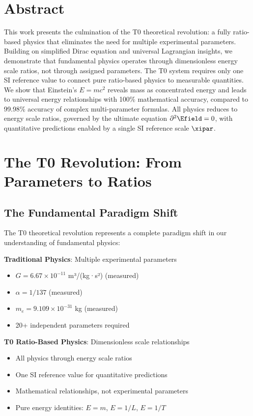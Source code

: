 \section*{Abstract}
		This work presents the culmination of the T0 theoretical revolution: a fully ratio-based physics that eliminates the need for multiple experimental parameters. Building on simplified Dirac equation and universal Lagrangian insights, we demonstrate that fundamental physics operates through dimensionless energy scale ratios, not through assigned parameters. The T0 system requires only one SI reference value to connect pure ratio-based physics to measurable quantities. We show that Einstein's $E = mc^2$ reveals mass as concentrated energy and leads to universal energy relationships with 100\% mathematical accuracy, compared to 99.98\% accuracy of complex multi-parameter formulas. All physics reduces to energy scale ratios, governed by the ultimate equation $\partial^2 \Efield = 0$, with quantitative predictions enabled by a single SI reference scale $\xipar$.

	
	
	\section{The T0 Revolution: From Parameters to Ratios}
	
	\subsection{The Fundamental Paradigm Shift}
	
	The T0 theoretical revolution represents a complete paradigm shift in our understanding of fundamental physics:
	
	\begin{tcolorbox}[colback=red!5!white,colframe=red!75!black,title=Paradigm Revolution]
		\textbf{Traditional Physics}: Multiple experimental parameters
		\begin{itemize}
			\item $G = 6.67 \times 10^{-11}$ m³/(kg·s²) (measured)
			\item $\alpha = 1/137$ (measured)
			\item $m_e = 9.109 \times 10^{-31}$ kg (measured)
			\item 20+ independent parameters required
		\end{itemize}
		
		\textbf{T0 Ratio-Based Physics}: Dimensionless scale relationships
		\begin{itemize}
			\item All physics through energy scale ratios
			\item One SI reference value for quantitative predictions
			\item Mathematical relationships, not experimental parameters
			\item Pure energy identities: $E = m$, $E = 1/L$, $E = 1/T$
		\end{itemize}
	\end{tcolorbox}
	
